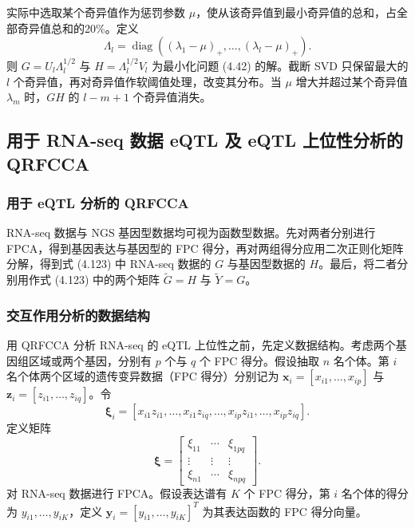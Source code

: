 实际中选取某个奇异值作为惩罚参数 $\mu$，使从该奇异值到最小奇异值的总和，占全部奇异值总和的20\%。定义
\[
\Lambda_l=\operatorname{diag}((\lambda_1-\mu)_+,\ldots,(\lambda_l-\mu)_+).
\]
则 $G=U_l\Lambda_l^{1/2}$ 与 $H=\Lambda_l^{1/2}V_l$ 为最小化问题 (4.42) 的解。截断 SVD 只保留最大的 $l$ 个奇异值，再对奇异值作软阈值处理，改变其分布。当 $\mu$ 增大并超过某个奇异值 $\lambda_m$ 时，$GH$ 的 $l-m+1$ 个奇异值消失。

\subsection{用于 RNA-seq 数据 eQTL 及 eQTL 上位性分析的 QRFCCA}
\subsubsection{用于 eQTL 分析的 QRFCCA}
RNA-seq 数据与 NGS 基因型数据均可视为函数型数据。先对两者分别进行 FPCA，得到基因表达与基因型的 FPC 得分，再对两组得分应用二次正则化矩阵分解，得到式 (4.123) 中 RNA-seq 数据的 $G$ 与基因型数据的 $H$。最后，将二者分别用作式 (4.123) 中的两个矩阵 $\widetilde G=H$ 与 $\widetilde Y=G$。

\subsubsection{交互作用分析的数据结构}
用 QRFCCA 分析 RNA-seq 的 eQTL 上位性之前，先定义数据结构。考虑两个基因组区域或两个基因，分别有 $p$ 个与 $q$ 个 FPC 得分。假设抽取 $n$ 名个体。第 $i$ 名个体两个区域的遗传变异数据（FPC 得分）分别记为 $\mathbf x_i=[x_{i1},\ldots,x_{ip}]$ 与 $\mathbf z_i=[z_{i1},\ldots,z_{iq}]$。令
\[
\boldsymbol\xi_i=[x_{i1}z_{i1},\ldots,x_{i1}z_{iq},\ldots,x_{ip}z_{i1},\ldots,x_{ip}z_{iq}].
\]
定义矩阵
\[
\boldsymbol\xi=\begin{bmatrix}\xi_{11}&\cdots&\xi_{1pq}\\\vdots&\vdots&\vdots\\\xi_{n1}&\cdots&\xi_{npq}\end{bmatrix}.
\]
对 RNA-seq 数据进行 FPCA。假设表达谱有 $K$ 个 FPC 得分，第 $i$ 名个体的得分为 $y_{i1},\ldots,y_{iK}$，定义 $\mathbf y_i=[y_{i1},\ldots,y_{iK}]^T$ 为其表达函数的 FPC 得分向量。


